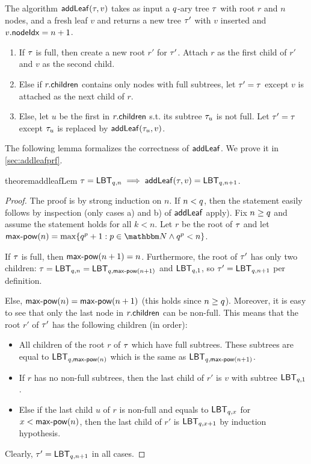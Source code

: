 \begin{definition}[$\addleaf$]\label{def:addleaf}
	The algorithm ${\mathsf{addLeaf}}(\tau, v)$ takes as input a $q$-ary tree $\tau$ with root $r$ and $n$ nodes, and a fresh leaf $v$ and returns a new tree $\tau'$ with $v$ inserted and $v.{\mathsf{nodeIdx}}=n+1$.
	\begin{enumerate}[label=\alph*),itemsep=0pt]
    \item If $\tau$ is full, then create a new root $r'$ for $\tau'$. Attach $r$ as the first child of $r'$ and $v$ as the second child.
    \item Else if $r.{\mathsf{children}}$ contains only nodes with full subtrees, let $\tau'=\tau$ except $v$ is attached as the next child of $r$.
    \item Else, let $u$ be the first in $r.{\mathsf{children}}$ s.t. its subtree $\tau_u$ is not full. Let $\tau'=\tau$ except $\tau_u$ is replaced by ${\mathsf{addLeaf}}(\tau_u,v)$.
	\end{enumerate}
\end{definition}

The following lemma formalizes the correctness of $\addleaf$. We prove it in \cref{sec:addleafprf}.
\begin{restatable}{theorem}{addleafLem}\label{lemm:addleaf}
	$\tau = {\mathsf{LBT}}_{q,n} \implies {\ensuremath{\mathsf{addLeaf}}}(\tau, v) = {\mathsf{LBT}}_{q,n+1}$.
\end{restatable}

\begin{proof}
  The proof is by strong induction on $n$. If $n<q$, then the statement easily follows by inspection (only cases a) and b) of $\addleaf$ apply).
  Fix $n\geq q$ and assume the statement holds for all $k<n$. Let $r$ be the root of $\tau$ and let $\mpow(n) = \max\{\treeArity^p + 1 : p \in \N \land \treeArity^p < n\}$.

  If $\tau$ is full, then ${\mathsf{max\textrm{-} pow}}(n+1)=n$. Furthermore, the root of $\tau'$ has only two children: $\tau={\mathsf{LBT}}_{q,n} = {\mathsf{LBT}}_{q,{\mathsf{max\textrm{-} pow}}(n+1)}$ and ${\mathsf{LBT}}_{q,1}$, so $\tau'={\mathsf{LBT}}_{q,n+1}$ per definition.

  Else, ${\mathsf{max\textrm{-} pow}}(n)={\mathsf{max\textrm{-} pow}}(n+1)$ (this holds since $n\geq q$). Moreover, it is easy to see that only the last node in $r.{\mathsf{children}}$ can be non-full. This means that the root $r'$ of $\tau'$ has the following children (in order):
  \begin{itemize}
    \item All children of the root $r$ of $\tau$ which have full subtrees. These subtrees are equal to ${\mathsf{LBT}}_{q,{\mathsf{max\textrm{-} pow}}(n)}$ which is the same as ${\mathsf{LBT}}_{q,{\mathsf{max\textrm{-} pow}}(n+1)}$.
    \item If $r$ has no non-full subtrees, then the last child of $r'$ is $v$ with subtree ${\mathsf{LBT}}_{q,1}$.
    \item Else if the last child $u$ of $r$ is non-full and equals to ${\mathsf{LBT}}_{q,x}$ for $x<{\mathsf{max\textrm{-} pow}}(n)$, then the last child of $r'$ is ${\mathsf{LBT}}_{q,x+1}$ by induction hypothesis.
  \end{itemize}
  Clearly, $\tau'={\mathsf{LBT}}_{q,n+1}$ in all cases.
\end{proof}